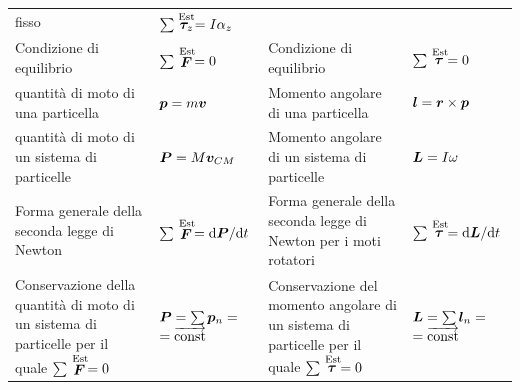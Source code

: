 \begin{small}
\begin{tabular}{p{4.0cm}p{2.45cm}p{4.0cm}p{2.38cm}}
    fisso                                             & $\sum\stackrel{\text{Est}}{\boldsymbol{\tau}_z}=I\alpha_z$                                                                                                                                                          \\
    Condizione di equilibrio                          & $\sum\stackrel{\text{Est}}{\boldsymbol{F}}=0$                                             & Condizione di equilibrio                                                                                            & $\sum\stackrel{\text{Est}}{\boldsymbol{\tau}}=0$                                                                                                                                                                                                                                                       \\
    quantità di moto di una particella                & $\boldsymbol{p}=m\boldsymbol{v}$                                                                                                      & Momento
    angolare di una particella                        & $\boldsymbol{l}=\boldsymbol{r}\times \boldsymbol{p}$                                                                                                                                                                                  \\
    quantità di moto di un sistema di particelle      & $\boldsymbol{P}=M\boldsymbol{v}_{CM}$                                           & Momento angolare di un sistema di particelle                                                                        & $\boldsymbol{L}=I\omega$                                                                                                                                                                                                                                                     \\
    Forma generale della seconda legge di
    Newton                                            & $\sum\stackrel{\text{Est}}{\boldsymbol{F}}=\mathrm{d} \boldsymbol{P}/\mathrm{d} t$                                                                  & Forma
    generale della seconda legge di Newton per i moti
    rotatori                                          & $\sum\stackrel{\text{Est}}{\boldsymbol{\tau}}=\mathrm{d} \boldsymbol{L}/\mathrm{d} t$                                                                                                                                                      \\
    Conservazione della quantità di moto di un sistema di particelle
    per il quale $\sum\stackrel{\text{Est}}{\boldsymbol{F}}=0$ & $\boldsymbol{P}=\sum
    \boldsymbol{p}_n=$ \mbox{$=\overrightarrow{\text{const}}$}         & Conservazione del momento angolare di un sistema di particelle per il quale $\sum\stackrel{\text{Est}}{\boldsymbol{\tau}}=0$ & $\boldsymbol{L}=\sum \boldsymbol{l}_n=$ \mbox{$=\overrightarrow{\text{const}}$}                                \\
    \hline
  \end{tabular}
\end{small}